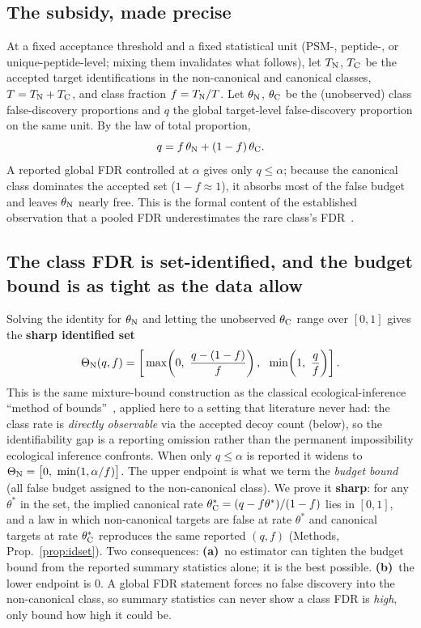 \subsection{The subsidy, made precise}
At a fixed acceptance threshold and a fixed statistical unit (PSM-, peptide-, or unique-peptide-level; mixing them invalidates what follows), let $T_{\mathrm{N}}$, $T_{\mathrm{C}}$ be the accepted target identifications in the non-canonical and canonical classes, $T=T_{\mathrm{N}}+T_{\mathrm{C}}$, and class fraction $f=T_{\mathrm{N}}/T$. Let $\theta_{\mathrm{N}}$, $\theta_{\mathrm{C}}$ be the (unobserved) class false-discovery proportions and $q$ the global target-level false-discovery proportion on the same unit. By the law of total proportion,
\begin{equation}
q = f\,\theta_{\mathrm{N}} + (1-f)\,\theta_{\mathrm{C}} .
\label{eq:identity}
\end{equation}
A reported global FDR controlled at $\alpha$ gives only $q \le \alpha$; because the canonical class dominates the accepted set ($1-f \approx 1$), it absorbs most of the false budget and leaves $\theta_{\mathrm{N}}$ nearly free. This is the formal content of the established observation that a pooled FDR underestimates the rare class's FDR~\cite{r4,r5,r10,r11}.

\subsection{The class FDR is set-identified, and the budget bound is as tight as the data allow}
Solving the identity for $\theta_{\mathrm{N}}$ and letting the unobserved $\theta_{\mathrm{C}}$ range over $[0,1]$ gives the \textbf{sharp identified set}
\begin{equation}
\SetN(q,f)=\left[\,\max\!\left(0,\ \frac{q-(1-f)}{f}\right),\ \ \min\!\left(1,\ \frac{q}{f}\right)\right].
\label{eq:idset}
\end{equation}
This is the same mixture-bound construction as the classical ecological-inference ``method of bounds''~\cite{r23}, applied here to a setting that literature never had: the class rate is \emph{directly observable} via the accepted decoy count (below), so the identifiability gap is a reporting omission rather than the permanent impossibility ecological inference confronts. When only $q \le \alpha$ is reported it widens to $\SetN=\bigl[0,\ \min(1,\alpha/f)\bigr]$. The upper endpoint is what we term the \emph{budget bound} (all false budget assigned to the non-canonical class). We prove it \textbf{sharp}: for any $\theta^{*}$ in the set, the implied canonical rate $\theta_{\mathrm{C}}^{*}=(q-f\theta^{*})/(1-f)$ lies in $[0,1]$, and a law in which non-canonical targets are false at rate $\theta^{*}$ and canonical targets at rate $\theta_{\mathrm{C}}^{*}$ reproduces the same reported $(q,f)$ (Methods, Prop.~\ref{prop:idset}). Two consequences: \textbf{(a)}~no estimator can tighten the budget bound from the reported summary statistics alone; it is the best possible. \textbf{(b)}~the lower endpoint is $0$. A global FDR statement forces no false discovery into the non-canonical class, so summary statistics can never show a class FDR is \emph{high}, only bound how high it could be.

